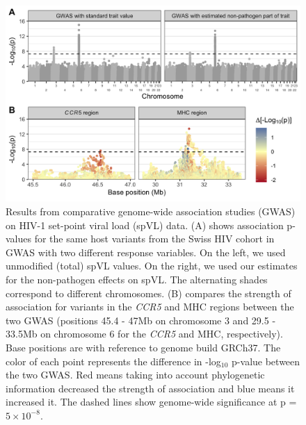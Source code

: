 \documentclass[11pt]{article}
\begin{document}
\begin{linenumbers}
\begin{figure}[H]
	\begin{center}
		\includegraphics[width=\linewidth]{figures/gwas_results}
		\caption{Results from comparative genome-wide association studies (GWAS) on HIV-1 set-point viral load (spVL) data. (A) shows association p-values for the same host variants from the Swiss HIV cohort in GWAS with two different response variables. On the left, we used unmodified (total) spVL values. On the right, we used our estimates for the non-pathogen effects on spVL. The alternating shades correspond to different chromosomes. (B) compares the strength of association for variants in the \emph{CCR5} and MHC regions between the two GWAS (positions 45.4 - 47Mb on chromosome 3 and 29.5 - 33.5Mb on chromosome 6 for the \emph{CCR5} and MHC, respectively). Base positions are with reference to genome build GRCh37. The color of each point represents the difference in -log$_{10}$ p-value between the two GWAS. Red means taking into account phylogenetic information decreased the strength of association and blue means it increased it. The dashed lines show genome-wide significance at p = $5 \times 10^{-8}$.}
		\label{fig:gwas-results}
	\end{center}
\end{figure}


\end{linenumbers}
\end{document}
